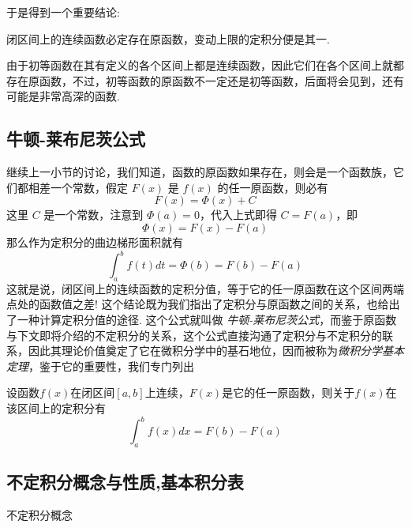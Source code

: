 于是得到一个重要结论:
\begin{inference}
  闭区间上的连续函数必定存在原函数，变动上限的定积分便是其一.
\end{inference}

由于初等函数在其有定义的各个区间上都是连续函数，因此它们在各个区间上就都存在原函数，不过，初等函数的原函数不一定还是初等函数，后面将会见到，还有可能是非常高深的函数.


\subsection{牛顿-莱布尼茨公式}
\label{sec:newton-leibniz-formular}

继续上一小节的讨论，我们知道，函数的原函数如果存在，则会是一个函数族，它们都相差一个常数，假定 $F(x)$ 是 $f(x)$ 的任一原函数，则必有
\[ F(x) = \Phi(x) +C \]
这里 $C$ 是一个常数，注意到 $\Phi(a)=0$，代入上式即得 $C=F(a)$，即
\[ \Phi(x) = F(x) - F(a) \]
那么作为定积分的曲边梯形面积就有
\[ \int_a^{b}f(t)dt = \Phi(b) = F(b) - F(a) \]
这就是说，闭区间上的连续函数的定积分值，等于它的任一原函数在这个区间两端点处的函数值之差! 这个结论既为我们指出了定积分与原函数之间的关系，也给出了一种计算定积分值的途径. 这个公式就叫做 \emph{牛顿-莱布尼茨公式}，而鉴于原函数与下文即将介绍的不定积分的关系，这个公式直接沟通了定积分与不定积分的联系，因此其理论价值奠定了它在微积分学中的基石地位，因而被称为\emph{微积分学基本定理}，鉴于它的重要性，我们专门列出
\begin{theorem}
  设函数$f(x)$在闭区间$[a,b]$上连续，$F(x)$是它的任一原函数，则关于$f(x)$在该区间上的定积分有
  \[ \int_a^{b} f(x)dx=F(b)-F(a) \]
\end{theorem}


\subsection{不定积分概念与性质,基本积分表}
\label{sec:indefinite-integral}

不定积分概念












